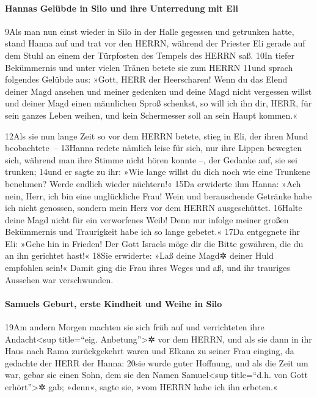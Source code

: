\hypertarget{hannas-geluxfcbde-in-silo-und-ihre-unterredung-mit-eli}{%
\paragraph{Hannas Gelübde in Silo und ihre Unterredung mit
Eli}\label{hannas-geluxfcbde-in-silo-und-ihre-unterredung-mit-eli}}

9Als man nun einst wieder in Silo in der Halle gegessen und getrunken
hatte, stand Hanna auf und trat vor den HERRN, während der Priester Eli
gerade auf dem Stuhl an einem der Türpfosten des Tempels des HERRN saß.
10In tiefer Bekümmernis und unter vielen Tränen betete sie zum HERRN
11und sprach folgendes Gelübde aus: »Gott, HERR der Heerscharen! Wenn du
das Elend deiner Magd ansehen und meiner gedenken und deine Magd nicht
vergessen willst und deiner Magd einen männlichen Sproß schenkst, so
will ich ihn dir, HERR, für sein ganzes Leben weihen, und kein
Schermesser soll an sein Haupt kommen.«

12Als sie nun lange Zeit so vor dem HERRN betete, stieg in Eli, der
ihren Mund beobachtete~-- 13Hanna redete nämlich leise für sich, nur
ihre Lippen bewegten sich, während man ihre Stimme nicht hören konnte
--, der Gedanke auf, sie sei trunken; 14und er sagte zu ihr: »Wie lange
willst du dich noch wie eine Trunkene benehmen? Werde endlich wieder
nüchtern!« 15Da erwiderte ihm Hanna: »Ach nein, Herr, ich bin eine
unglückliche Frau! Wein und berauschende Getränke habe ich nicht
genossen, sondern mein Herz vor dem HERRN ausgeschüttet. 16Halte deine
Magd nicht für ein verworfenes Weib! Denn nur infolge meiner großen
Bekümmernis und Traurigkeit habe ich so lange gebetet.« 17Da entgegnete
ihr Eli: »Gehe hin in Frieden! Der Gott Israels möge dir die Bitte
gewähren, die du an ihn gerichtet hast!« 18Sie erwiderte: »Laß deine
Magd✲ deiner Huld empfohlen sein!« Damit ging die Frau ihres Weges und
aß, und ihr trauriges Aussehen war verschwunden.

\hypertarget{samuels-geburt-erste-kindheit-und-weihe-in-silo}{%
\paragraph{Samuels Geburt, erste Kindheit und Weihe in
Silo}\label{samuels-geburt-erste-kindheit-und-weihe-in-silo}}

19Am andern Morgen machten sie sich früh auf und verrichteten ihre
Andacht\textless sup title=``eig. Anbetung''\textgreater✲ vor dem HERRN,
und als sie dann in ihr Haus nach Rama zurückgekehrt waren und Elkana zu
seiner Frau einging, da gedachte der HERR der Hanna: 20sie wurde guter
Hoffnung, und als die Zeit um war, gebar sie einen Sohn, dem sie den
Namen Samuel\textless sup title=``d.h. von Gott erhört''\textgreater✲
gab; »denn«, sagte sie, »vom HERRN habe ich ihn erbeten.«

